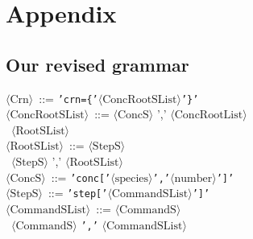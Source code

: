 \section{Appendix}
\subsection{Our revised grammar}\label{sec:grammar_revised}

\begin{tabbing}
    $\langle \text{Crn} \rangle$ \,::=\; \= \texttt{'crn=\{'$\langle \text{ConcRootSList} \rangle$'\}'} \\
    
    $\langle \text{ConcRootSList} \rangle$ \,::=\;  $\langle \text{ConcS} \rangle$ ',' $\langle \text{ConcRootList} \rangle$ \\
    \>\textbar \, $\langle \text{RootSList} \rangle$ \\

    $\langle \text{RootSList} \rangle$ \,::=\;  $\langle \text{StepS} \rangle$ \\
    \>\textbar \, $\langle \text{StepS} \rangle$ ',' $\langle \text{RootSList} \rangle$ \\
     
    $\langle \text{ConcS} \rangle$ \,::=\;  \texttt{'conc['$\langle \text{species} \rangle$','$\langle \text{number} \rangle$']'} \\
    
    $\langle \text{StepS} \rangle$ \,::=\;  \texttt{'step['$\langle \text{CommandSList} \rangle$']'} \\
    
    $\langle \text{CommandSList} \rangle$ \,::=\;  $\langle \text{CommandS} \rangle$ \\
    \>\textbar \, $\langle \text{CommandS} \rangle$ \texttt{','} $\langle \text{CommandSList} \rangle$ \\
     

\end{tabbing}

